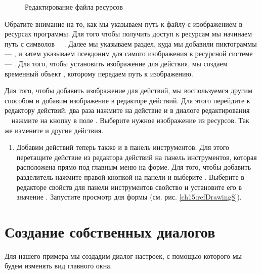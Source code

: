 \begin{figure}[htb]
\caption[Редактирование файла ресурсов]{Редактирование файла ресурсов}
\label{ch15:refDrawing7}

\end{figure}
Обратите внимание на то, как мы указываем путь к файлу с изображением в ресурсах программы. Для того чтобы получить
доступ к ресурсам мы начинаем путь с символов \ \ \Sys{:/}. Далее мы указываем раздел, куда мы добавили
пиктограммы --- , и затем указываем псевдоним для самого изображения в ресурсной системе ---
. Для того, чтобы установить изображение для действия, мы создаем временный объект
, которому передаем путь к изображению. 

Для того, чтобы добавить изображение для действий, мы воспользуемся другим способом и добавим изображение в редакторе
действий. Для этого перейдите к редактору действий, два раза нажмите на действие и в диалоге редактирования \ \ нажмите
на кнопку  в поле .
Выберите нужное изображение из ресурсов. Так же измените и другие действия. 

\begin{enumerate}
\item Добавим действий теперь также и в панель инструментов. Для этого перетащите действие из редактора действий на
панель инструментов, которая расположена прямо под главным меню на форме. Для того, чтобы добавить разделитель нажмите
правой кнопкой на панели и выберите . Выберите в редакторе свойств для панели
инструментов свойство  и установите его в значение
. Запустите просмотр для формы (см. рис. \ref{ch15:refDrawing8}).
\end{enumerate}
\section[\ Создание собственных диалогов]{ Создание собственных диалогов}
Для нашего примера мы создадим диалог настроек, с помощью которого мы будем изменять вид главного окна. 

